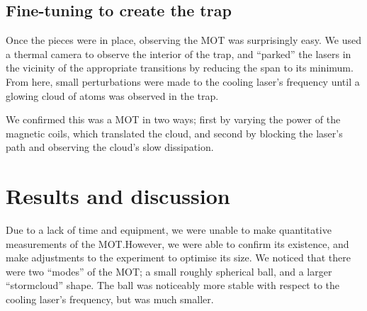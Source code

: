 \documentclass[11pt,twoside,a4paper]{article}
\begin{document}
\subsection{Fine-tuning to create the trap}
Once the pieces were in place, observing the MOT was surprisingly easy. We used a thermal camera to observe the interior of the trap, and ``parked'' the lasers
in the vicinity of the appropriate transitions by reducing the span to its minimum. From here, small perturbations were made to the cooling laser's frequency
until a glowing cloud of atoms was observed in the trap.

We confirmed this was a MOT in two ways; first by varying the power of the magnetic coils, which translated the cloud, and second by blocking the laser's path
and observing the cloud's slow dissipation.
\section{Results and discussion}
Due to a lack of time and equipment, we were unable to make quantitative measurements of the MOT.\@ However, we were able to confirm its existence, and make adjustments
to the experiment to optimise its size. We noticed that there were two ``modes'' of the MOT; a small roughly spherical ball, and a larger ``stormcloud'' shape. The ball
was noticeably more stable with respect to the cooling laser's frequency, but was much smaller.
\end{document}
